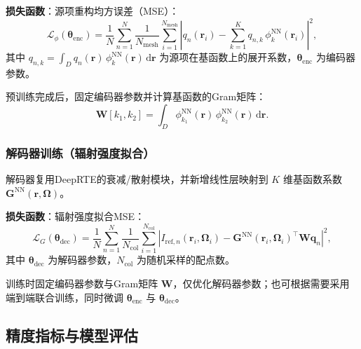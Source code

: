 \textbf{损失函数}：源项重构均方误差（MSE）：
\begin{equation}
    \mathcal{L}_\phi(\boldsymbol{\theta}_\text{enc}) = \frac{1}{N}\sum_{n=1}^N \frac{1}{N_{\text{mesh}}} \sum_{i=1}^{N_{\text{mesh}}} \left| q_n(\boldsymbol{r}_i) - \sum_{k=1}^K q_{n,k}\,\phi_k^{\text{NN}}(\boldsymbol{r}_i) \right|^2,
\end{equation}
其中 $q_{n,k} = \int_D q_n(\boldsymbol{r})\,\phi_k^{\text{NN}}(\boldsymbol{r})\,\mathrm{d}\boldsymbol{r}$ 为源项在基函数上的展开系数，$\boldsymbol{\theta}_\text{enc}$ 为编码器参数。

预训练完成后，固定编码器参数并计算基函数的Gram矩阵：
\begin{equation}
    \boldsymbol{W}[k_1,k_2] = \int_D \phi_{k_1}^{\text{NN}}(\boldsymbol{r})\,\phi_{k_2}^{\text{NN}}(\boldsymbol{r})\,\mathrm{d}\boldsymbol{r}.
\end{equation}

\subsubsection{解码器训练（辐射强度拟合）}
解码器复用DeepRTE的衰减/散射模块，并新增线性层映射到 $K$ 维基函数系数 $\boldsymbol{G}^{\text{NN}}(\boldsymbol{r},\boldsymbol{\Omega})$。

\textbf{损失函数}：辐射强度拟合MSE：
\begin{equation}
    \mathcal{L}_G(\boldsymbol{\theta}_\text{dec}) = \frac{1}{N}\sum_{n=1}^N \frac{1}{N_{\text{col}}} \sum_{i=1}^{N_{\text{col}}} \left| I_{\text{ref},n}(\boldsymbol{r}_i,\boldsymbol{\Omega}_i) - \boldsymbol{G}^{\text{NN}}(\boldsymbol{r}_i,\boldsymbol{\Omega}_i)^\top \boldsymbol{W} \boldsymbol{q}_n \right|^2,
\end{equation}
其中 $\boldsymbol{\theta}_\text{dec}$ 为解码器参数，$N_{\text{col}}$ 为随机采样的配点数。

训练时固定编码器参数与Gram矩阵 $\boldsymbol{W}$，仅优化解码器参数；也可根据需要采用端到端联合训练，同时微调 $\boldsymbol{\theta}_\text{enc}$ 与 $\boldsymbol{\theta}_\text{dec}$。

\subsection{精度指标与模型评估}

